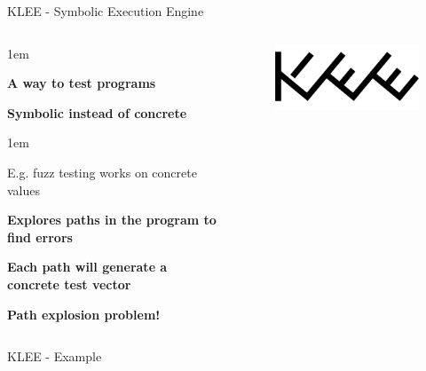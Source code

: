 \begin{frame}{KLEE - Symbolic Execution Engine}
    \begin{columns}
        \begin{itemize-size}{1em}
            \item \textbf{A way to test programs}
            \item \textbf{Symbolic instead of concrete}
            \begin{itemize-size}{1em}
                \item E.g. fuzz testing works on concrete values
            \end{itemize-size}
        \item \textbf{Explores paths in the program to find errors}
        \item \textbf{Each path will generate a concrete test vector}
        \item \textbf{Path explosion problem!}
        \end{itemize-size}

        \begin{figure}
            \centering
            \includegraphics[scale=0.55]{pictures/klee.png}
        \end{figure}
    \end{columns}
\end{frame}

\begin{frame}{KLEE - Example}

\end{frame}

